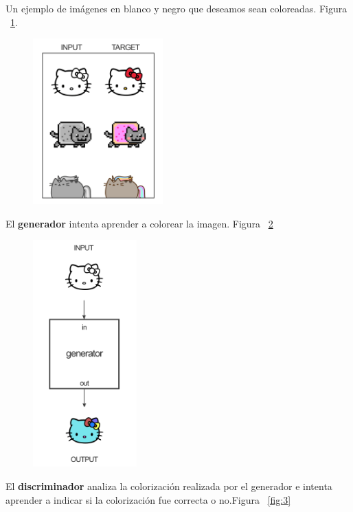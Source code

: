\documentclass[10pt,journal,compsoc]{IEEEtran}\usepackage[T1]{fontenc}                              %
\begin{document}
Un ejemplo de imágenes en blanco y negro que deseamos sean coloreadas.
Figura ~\ref{fig:1}.

\begin{figure}[!htb]
  \begin{center}
    \includegraphics[width=5cm]{./imgs/02_pix2pix_example.png}
    \caption{}
    \label{fig:1}
  \end{center}
\end{figure}

El \textbf{generador} intenta aprender a colorear la imagen. Figura ~\ref{fig:2}

\begin{figure}[!htb]
  \begin{center}
    \includegraphics[width=4cm]{./imgs/03_pix2pix_example.png}
    \caption{}
    \label{fig:2}
  \end{center}
\end{figure}

El \textbf{discriminador} analiza la colorización realizada por el
generador e intenta aprender a indicar si la colorización fue correcta o
no.Figura ~\ref{fig:3}
\end{document}
